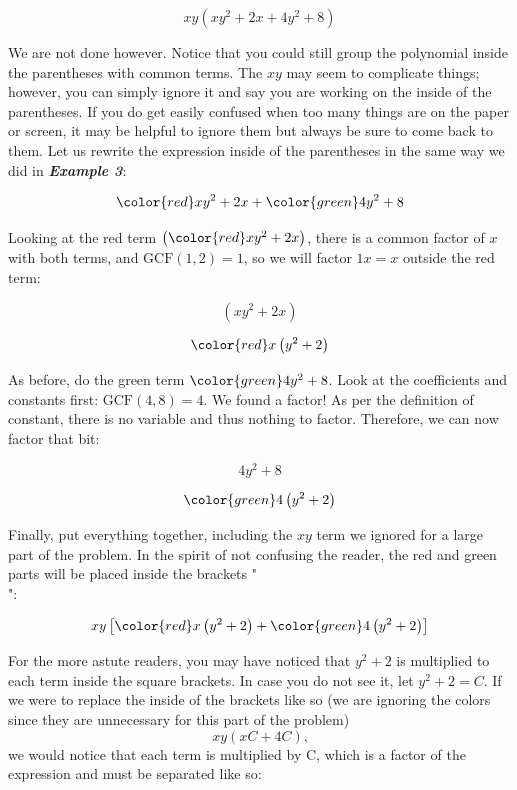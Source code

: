 $$xy\left(xy^{2}+2x+4y^{2}+8\right)$$



We are not done however. Notice that you could still group the polynomial inside the
parentheses with common terms. The $xy$ may seem to complicate things; however, you can
simply ignore it and say you are working on the inside of the parentheses. If you do get
easily confused when too many things are on the paper or screen, it may be helpful to
ignore them but always be sure to come back to them. Let us rewrite the expression inside
of the parentheses in the same way we did in \textbf{\textit{Example 3}}:



$${\color{red}xy^{2}+2x}+{\color{green}4y^{2}+8}$$



Looking at the red term $\left({\color{red}xy^{2}+2x}\right)$, there is a common factor of
$x$ with both terms, and $\text{GCF}\left(1,2\right)=1$, so we will factor $1x=x$ outside
the red term:



$$\left(xy^{2}+2x\right)$$



$${\color{red}x\left(y^{2}+2\right)}$$



As before, do the green term ${\color{green}4y^{2}+8}$. Look at the coefficients and
constants first: $\text{GCF}\left(4,8\right)=4$. We found a factor! As per the definition
of constant, there is no variable and thus nothing to factor. Therefore, we can now factor
that bit:



$$4y^{2}+8$$



$${\color{green}4\left(y^{2}+2\right)}$$



Finally, put everything together, including the $xy$ term we ignored for a large part of
the problem. In the spirit of not confusing the reader, the red and green parts will be
placed inside the brackets "\[\]":



$$xy\left[{\color{red}x\left(y^{2}+2\right)}+{\color{green}4\left(y^{2}+2\right)}\right]$$



For the more astute readers, you may have noticed that $y^{2}+2$ is multiplied to each
term inside the square brackets. In case you do not see it, let $y^{2}+2=C$. If we were to
replace the inside of the brackets like so (we are ignoring the colors since they are
unnecessary for this part of the problem)$$xy\left(xC+4C\right)\text{,}$$we would notice
that each term is multiplied by C, which is a factor of the expression and must be
separated like so:



